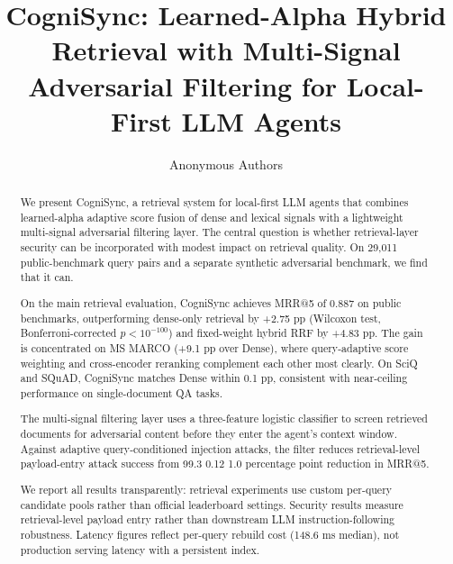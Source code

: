 \documentclass[sigconf]{acmart}
\begin{document}
\title{CogniSync: Learned-Alpha Hybrid Retrieval with Multi-Signal Adversarial Filtering for Local-First LLM Agents}

\author{Anonymous Authors}
\renewcommand{\shortauthors}{Anonymous et al.}

\begin{abstract}

We present CogniSync, a retrieval system for local-first LLM agents that
combines learned-alpha adaptive score fusion of dense and lexical signals with a
lightweight multi-signal adversarial filtering layer. The central question is
whether retrieval-layer security can be incorporated with modest impact on
retrieval quality. On 29,011 public-benchmark query pairs and a separate
synthetic adversarial benchmark, we find that it can.

On the main retrieval evaluation, CogniSync achieves MRR@5 of 0.887 on public
benchmarks, outperforming dense-only retrieval by +2.75 pp (Wilcoxon test,
Bonferroni-corrected $p < 10^{-100}$) and fixed-weight hybrid RRF by +4.83 pp.
The gain is concentrated on MS MARCO (+9.1 pp over Dense), where
query-adaptive score weighting and cross-encoder reranking complement each other
most clearly. On SciQ and SQuAD, CogniSync matches Dense within 0.1 pp,
consistent with near-ceiling performance on single-document QA tasks.

The multi-signal filtering layer uses a three-feature logistic classifier to
screen retrieved documents for adversarial content before they enter the
agent's context window. Against adaptive query-conditioned injection attacks,
the filter reduces retrieval-level payload-entry attack success from 99.3%
0.12%
1.0 percentage point reduction in MRR@5.

We report all results transparently: retrieval experiments use custom
per-query candidate pools rather than official leaderboard settings.
Security results measure retrieval-level payload entry rather than downstream
LLM instruction-following robustness. Latency figures reflect per-query rebuild
cost (148.6 ms median), not production serving latency with a persistent index.

\end{abstract}
\end{document}
